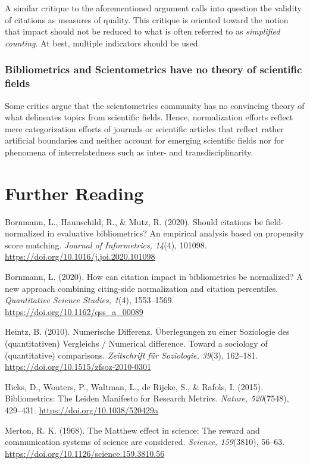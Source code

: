 \documentclass[
  letterpaper,
]{scrreprt}
\begin{document}
A similar critique to the aforementioned argument calls into question
the validity of citations as measures of quality. This critique is
oriented toward the notion that impact should not be reduced to what is
often referred to as \emph{simplified counting}. At best, multiple
indicators should be used.

\subsubsection{Bibliometrics and Scientometrics have no theory of
scientific
fields}\label{bibliometrics-and-scientometrics-have-no-theory-of-scientific-fields}

Some critics argue that the scientometrics community has no convincing
theory of what delineates topics from scientific fields. Hence,
normalization efforts reflect mere categorization efforts of journals or
scientific articles that reflect rather artificial boundaries and
neither account for emerging scientific fields nor for phenomena of
interrelatedness such as inter- and transdisciplinarity.

\section{Further Reading}\label{further-reading-6}

Bornmann, L., Haunschild, R., \& Mutz, R. (2020). Should citations be
field-normalized in evaluative bibliometrics? An empirical analysis
based on propensity score matching. \emph{Journal of Informetrics,
14}(4), 101098. \url{https://doi.org/10.1016/j.joi.2020.101098}

Bornmann, L. (2020). How can citation impact in bibliometrics be
normalized? A new approach combining citing-side normalization and
citation percentiles. \emph{Quantitative Science Studies, 1}(4),
1553--1569. \url{https://doi.org/10.1162/qss_a_00089}

Heintz, B. (2010). Numerische Differenz. Überlegungen zu einer
Soziologie des (quantitativen) Vergleichs / Numerical difference. Toward
a sociology of (quantitative) comparisons. \emph{Zeitschrift für
Soziologie, 39}(3), 162--181.
\url{https://doi.org/10.1515/zfsoz-2010-0301}

Hicks, D., Wouters, P., Waltman, L., de Rijcke, S., \& Rafols, I.
(2015). Bibliometrics: The Leiden Manifesto for Research Metrics.
\emph{Nature, 520}(7548), 429--431.
\url{https://doi.org/10.1038/520429a}

Merton, R. K. (1968). The Matthew effect in science: The reward and
communication systems of science are considered. \emph{Science,
159}(3810), 56--63. \url{https://doi.org/10.1126/science.159.3810.56}
\end{document}
